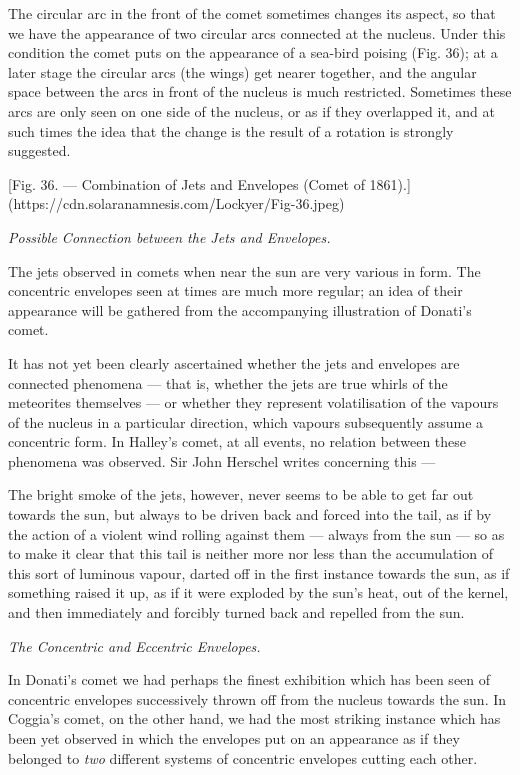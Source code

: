 \documentclass[a4paper, 12pt, oneside, polutonikogreek, english]{article}
\begin{document}
The circular arc in the front of the comet sometimes changes its aspect, so that we have the appearance of two circular arcs connected at the nucleus. Under this condition the comet puts on the appearance of a sea-bird poising (Fig. 36); at a later stage the circular arcs (the wings) get nearer together, and the angular space between the arcs in front of the nucleus is much restricted. Sometimes these arcs are only seen on one side of the nucleus, or as if they overlapped it, and at such times the idea that the change is the result of a rotation is strongly suggested.

[Fig. 36. --- Combination of Jets and Envelopes (Comet of 1861).](https://cdn.solaranamnesis.com/Lockyer/Fig-36.jpeg)

\emph{Possible Connection between the Jets and Envelopes.}

The jets observed in comets when near the sun are very various in form. The concentric envelopes seen at times are much more regular; an idea of their appearance will be gathered from the accompanying illustration of Donati's comet.

It has not yet been clearly ascertained whether the jets and envelopes are connected phenomena --- that is, whether the jets are true whirls of the meteorites themselves --- or whether they represent volatilisation of the vapours of the nucleus in a particular direction, which vapours subsequently assume a concentric form. In Halley's comet, at all events, no relation between these phenomena was observed. Sir John Herschel writes concerning this ---

The bright smoke of the jets, however, never seems to be able to get far out towards the sun, but always to be driven back and forced into the tail, as if by the action of a violent wind rolling against them --- always from the sun --- so as to make it clear that this tail is neither more nor less than the accumulation of this sort of luminous vapour, darted off in the first instance towards the sun, as if something raised it up, as if it were exploded by the sun's heat, out of the kernel, and then immediately and forcibly turned back and repelled from the sun.

\emph{The Concentric and Eccentric Envelopes.}

In Donati's comet we had perhaps the finest exhibition which has been seen of concentric envelopes successively thrown off from the nucleus towards the sun. In Coggia's comet, on the other hand, we had the most striking instance which has been yet observed in which the envelopes put on an appearance as if they belonged to \emph{two} different systems of concentric envelopes cutting each other.
\end{document}
